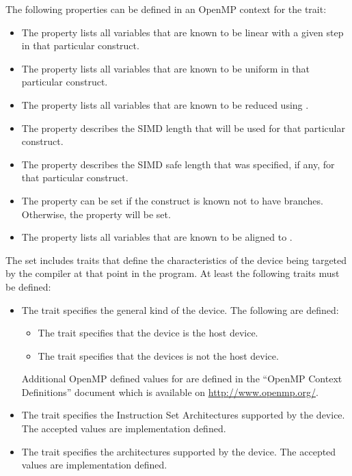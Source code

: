 The following properties can be defined in an OpenMP context for the  trait:
\begin{itemize}
 \item The  property lists all variables that are known to be linear with a given step in that particular  construct.
 \item The  property lists all variables that are known to be uniform in that particular  construct.
 \item The  property lists all variables that are known to be reduced using .
 \item The  property describes the SIMD length that will be used for that particular  construct.
 \item The  property describes the SIMD safe length that was specified, if any, for that particular  construct.
 \item The  property can be set if the  construct is known not to have branches. Otherwise, the  property will be set.
 \item The  property lists all variables that are known to be aligned to .
\end{itemize}

The  set includes traits that define the characteristics of the device being targeted by the compiler at that point in the program. At least the following traits must be defined:
\begin{itemize}
 \item The  trait specifies the general kind of the device. The following  are defined:
 \begin{itemize}
  \item The  trait specifies that the device is the host device.
  \item The  trait specifies that the devices is not the host device.
 \end{itemize}
 Additional OpenMP defined values for  are defined in the ``OpenMP Context Definitions'' document which is available on \url{http://www.openmp.org/}. 
 \item The  trait specifies the Instruction Set Architectures supported by the device. The accepted  values are implementation defined.
 \item The  trait specifies the architectures supported by the device. The accepted  values are implementation defined.
\end{itemize}

